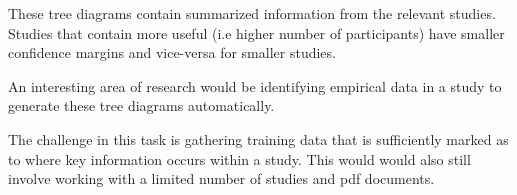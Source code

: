 These tree diagrams contain summarized information from the relevant studies. Studies that contain more useful (i.e higher number of participants) have smaller confidence margins and vice-versa for smaller studies.

An interesting area of research would be identifying empirical data in a study to generate these tree diagrams automatically.

The challenge in this task is gathering training data that is sufficiently marked as to where key information occurs within a study. This would would also still involve working with a limited number of studies and pdf documents.